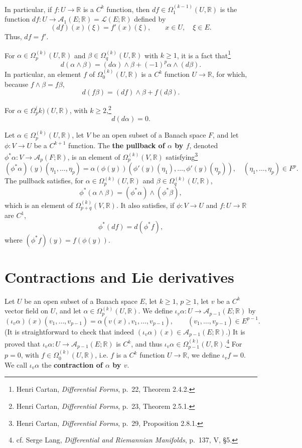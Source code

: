 \documentclass{article}
\theoremstyle{definition}
\theoremstyle{definition}
\begin{document}
In particular, if $f:U \to \mathbb{R}$ is a $C^k$ function, then
$df \in \Omega_1^{(k-1)}(U,\mathbb{R})$ is the function
$df:U \to \mathscr{A}_1(E;\mathbb{R})=\mathscr{L}(E;\mathbb{R})$ defined by
\[
(df)(x)(\xi) = f'(x)(\xi), \qquad x \in U, \quad \xi \in E.
\]
Thus, $df=f'$. 

For $\alpha \in \Omega_p^{(k)}(U,\mathbb{R})$ and $\beta \in \Omega_q^{(k)}(U,\mathbb{R})$
with $k \geq 1$, it is a fact that\footnote{Henri Cartan,
{\em Differential Forms}, p.~22, Theorem 2.4.2.}
\[
d(\alpha \wedge \beta) = (d\alpha) \wedge \beta + (-1)^p \alpha \wedge(d\beta).
\]
In particular, an element $f$ of $\Omega_0^{(k)}(U,\mathbb{R})$ is a $C^k$ function
$U \to \mathbb{R}$, for which, because $f \wedge \beta = f \beta$,  
\[
d(f \beta) = (df) \wedge \beta + f (d\beta).
\]

For $\alpha \in \Omega_p^({k)}(U,\mathbb{R})$, with $k \geq 2$,\footnote{Henri Cartan,
{\em Differential Forms}, p.~23, Theorem 2.5.1.}
\[
d(d\alpha)=0.
\]

Let $\alpha \in \Omega_p^{(k)}(U,\mathbb{R})$, let
$V$ be an open subset of a Banach space $F$, and let 
$\phi:V \to U$ be a $C^{k+1}$ function. 
The \textbf{the pullback of $\alpha$ by $f$}, denoted
$\phi^* \alpha:V \to \mathscr{A}_p(F;\mathbb{R})$, is an element of
$\Omega_p^{(k)}(V,\mathbb{R})$ 
satisfying\footnote{Henri Cartan,
{\em Differential Forms}, p.~29, Proposition 2.8.1.}
\[
(\phi^* \alpha)(y)(\eta_1,\ldots,\eta_p) = \alpha(\phi(y))(\phi'(y)(\eta_1),\ldots,
\phi'(y)(\eta_p)),
\quad (\eta_1,\ldots,\eta_p) \in F^p.
\]
The pullback satisfies, for $\alpha \in \Omega_p^{(k)}(U,\mathbb{R})$
and $\beta \in \Omega_q^{(k)}(U,\mathbb{R})$,
\[
\phi^*(\alpha \wedge \beta)  = (\phi^* \alpha) \wedge (\phi^* \beta),
\]
which is an element of $\Omega_{p+q}^{(k)}(V,\mathbb{R})$. It also satisfies,
if $\phi:V \to U$ and $f:U \to \mathbb{R}$ are $C^1$, 
\[
\phi^*(df) = d(\phi^*f),
\]
where $(\phi^*f)(y) = f(\phi(y))$. 



\section{Contractions and Lie derivatives}
Let $U$ be an open subset of a Banach space $E$, let $k \geq 1$, $p \geq 1$, let
$v$ be a $C^k$ vector field on $U$, and let $\alpha \in \Omega_p^{(k)}(U,\mathbb{R})$. 
We define $\iota_v \alpha:U \to \mathscr{A}_{p-1}(E;\mathbb{R})$ by
\[
(\iota_v \alpha)(x)(v_1,\ldots,v_{p-1}) = \alpha(v(x),v_1,\ldots,v_{p-1}), \qquad (v_1,\ldots,v_{p-1}) \in E^{p-1}.
\]
(It is straightforward to check that indeed $(\iota_v \alpha)(x) \in \mathscr{A}_{p-1}(E;\mathbb{R})$.)
It is proved that $\iota_v \alpha:U \to \mathscr{A}_{p-1}(E;\mathbb{R})$ is $C^k$, and thus
$\iota_v \alpha \in \Omega_{p-1}^{(k)}(U,\mathbb{R})$.\footnote{cf. Serge Lang,
{\em Differential and Riemannian Manifolds}, p.~137, V, \S 5.}
For $p=0$, with $f \in \Omega_0^{(k)}(U,\mathbb{R})$, i.e. $f$ is a $C^k$ function
$U \to \mathbb{R}$,
we define $\iota_v f = 0$.
We call $\iota_v \alpha$ the \textbf{contraction of $\alpha$ by $v$}.
\end{document}
